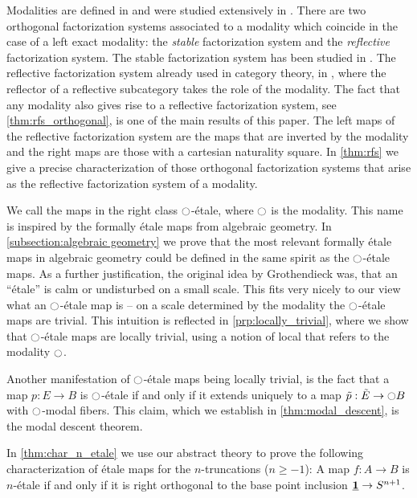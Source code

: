 \documentclass[9pt,twosided]{amsart}
\begin{document}
Modalities are defined in \cite[Section 7.7]{UFP} and were studied extensively in \cite{RijkeSpittersShulman}.
There are two orthogonal factorization systems associated to a modality which coincide in the case of a left exact modality: the \emph{stable} factorization system and the \emph{reflective} factorization system. The stable factorization system has been studied in \cite{RijkeSpittersShulman}. The reflective factorization system already used in category theory, in \cite{cassidy_hebert_kelly_1985}, where the reflector of a reflective subcategory takes the role of the modality. The fact that any modality also gives rise to a reflective factorization system, see \cref{thm:rfs_orthogonal}, is one of the main results of this paper. The left maps of the reflective factorization system are the maps that are inverted by the modality and the right maps are those with a cartesian naturality square. In \cref{thm:rfs} we give a precise characterization of those orthogonal factorization systems that arise as the reflective factorization system of a modality.

We call the maps in the right class ${\ocircle}$-étale, where ${\ocircle}$ is the modality. This name is inspired by the formally étale maps from algebraic geometry.
In \ref{subsection:algebraic geometry} we prove that the most relevant formally étale maps in algebraic geometry could be defined in the same spirit as the ${\ocircle}$-étale maps.
As a further justification, the original idea by Grothendieck was, that an ``étale'' is calm or undisturbed on a small scale.
This fits very nicely to our view what an ${\ocircle}$-étale map is -- on a scale determined by the modality the ${\ocircle}$-étale maps are trivial.
This intuition is reflected in \cref{prp:locally_trivial}, where we show that ${\ocircle}$-\'etale maps are locally trivial, using a notion of local that refers to the modality ${\ocircle}$.

Another manifestation of ${\ocircle}$-\'etale maps being locally trivial, is the fact that a map $p:E\to B$ is ${\ocircle}$-\'etale if and only if it extends uniquely to a map $\tilde{p}:\tilde{E}\to {\ensuremath{\ocircle}} B$ with ${\ocircle}$-modal fibers. This claim, which we establish in \cref{thm:modal_descent}, is the modal descent theorem. 

In \cref{thm:char_n_etale} we use our abstract theory to prove the following characterization of étale maps for the $n$-truncations ($n\geq -1$):
A map $f:A\to B$ is $n$-\'etale if and only if it is right orthogonal to the base point inclusion $\underline{\mathbf{1}}\to S^{n+1}$.
\end{document}
